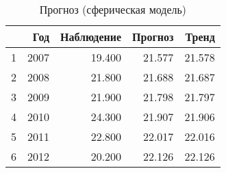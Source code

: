 \begin{table}[ht]
\centering
\begin{tabular}{rrrrr}
  \hline
 & Год & Наблюдение & Прогноз & Тренд \\ 
  \hline
1 & 2007 & 19.400 & 21.577 & 21.578 \\ 
  2 & 2008 & 21.800 & 21.688 & 21.687 \\ 
  3 & 2009 & 21.900 & 21.798 & 21.797 \\ 
  4 & 2010 & 24.300 & 21.907 & 21.906 \\ 
  5 & 2011 & 22.800 & 22.017 & 22.016 \\ 
  6 & 2012 & 20.200 & 22.126 & 22.126 \\ 
   \hline
\end{tabular}
\caption{Прогноз (сферическая модель)} 
\label{table:manual-prediction}
\end{table}
